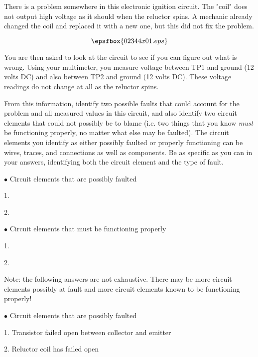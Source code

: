 

There is a problem somewhere in this electronic ignition circuit.  The "coil" does not output high voltage as it should when the reluctor spins.  A mechanic already changed the coil and replaced it with a new one, but this did not fix the problem.

$$\epsfbox{02344x01.eps}$$

You are then asked to look at the circuit to see if you can figure out what is wrong.  Using your multimeter, you measure voltage between TP1 and ground (12 volts DC) and also between TP2 and ground (12 volts DC).  These voltage readings do not change at all as the reluctor spins.

From this information, identify two possible faults that could account for the problem and all measured values in this circuit, and also identify two circuit elements that could not possibly be to blame (i.e. two things that you know {\it must} be functioning properly, no matter what else may be faulted).  The circuit elements you identify as either possibly faulted or properly functioning can be wires, traces, and connections as well as components.  Be as specific as you can in your answers, identifying both the circuit element and the type of fault.

\medskip
\goodbreak
\item{$\bullet$} Circuit elements that are possibly faulted
\item{1.}
\item{2.} 
\medskip

\medskip
\goodbreak
\item{$\bullet$} Circuit elements that must be functioning properly
\item{1.} 
\item{2.} 
\medskip







Note: the following answers are not exhaustive.  There may be more circuit elements possibly at fault and more circuit elements known to be functioning properly!

\medskip
\goodbreak
\item{$\bullet$} Circuit elements that are possibly faulted
\item{1.} Transistor failed open between collector and emitter
\item{2.} Reluctor coil has failed open
\medskip

